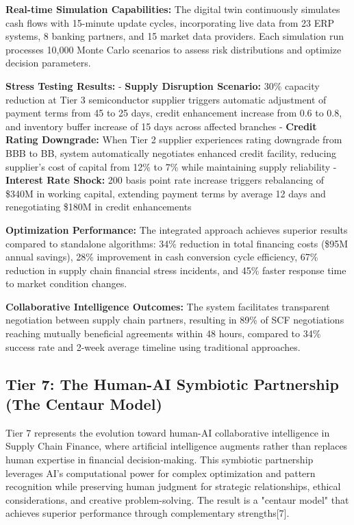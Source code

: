 \documentclass{article}
\begin{document}
\textbf{Real-time Simulation Capabilities:}
The digital twin continuously simulates cash flows with 15-minute update cycles, incorporating live data from 23 ERP systems, 8 banking partners, and 15 market data providers. Each simulation run processes 10,000 Monte Carlo scenarios to assess risk distributions and optimize decision parameters.

\textbf{Stress Testing Results:}
- \textbf{Supply Disruption Scenario:} 30\% capacity reduction at Tier 3 semiconductor supplier triggers automatic adjustment of payment terms from 45 to 25 days, credit enhancement increase from 0.6 to 0.8, and inventory buffer increase of 15 days across affected branches
- \textbf{Credit Rating Downgrade:} When Tier 2 supplier experiences rating downgrade from BBB to BB, system automatically negotiates enhanced credit facility, reducing supplier's cost of capital from 12\% to 7\% while maintaining supply reliability
- \textbf{Interest Rate Shock:} 200 basis point rate increase triggers rebalancing of \$340M in working capital, extending payment terms by average 12 days and renegotiating \$180M in credit enhancements

\textbf{Optimization Performance:}
The integrated approach achieves superior results compared to standalone algorithms: 34\% reduction in total financing costs (\$95M annual savings), 28\% improvement in cash conversion cycle efficiency, 67\% reduction in supply chain financial stress incidents, and 45\% faster response time to market condition changes.

\textbf{Collaborative Intelligence Outcomes:}
The system facilitates transparent negotiation between supply chain partners, resulting in 89\% of SCF negotiations reaching mutually beneficial agreements within 48 hours, compared to 34\% success rate and 2-week average timeline using traditional approaches.

\subsection{Tier 7: The Human-AI Symbiotic Partnership (The Centaur Model)}

Tier 7 represents the evolution toward human-AI collaborative intelligence in Supply Chain Finance, where artificial intelligence augments rather than replaces human expertise in financial decision-making. This symbiotic partnership leverages AI's computational power for complex optimization and pattern recognition while preserving human judgment for strategic relationships, ethical considerations, and creative problem-solving. The result is a "centaur model" that achieves superior performance through complementary strengths[7].
\end{document}
